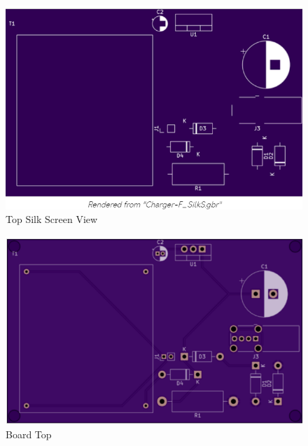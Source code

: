 \documentclass{article}
\begin{document}
\begin{figure}[h!]
\centerline{\includegraphics[scale=.6]{Images/u6.png}}
\caption{Top Silk Screen View}
\label{figb}
\end{figure}

\begin{figure}[h!]
\centerline{\includegraphics[scale=.6]{Images/u10.png}}
\caption{Board Top}
\label{figb}
\end{figure}
\end{document}

